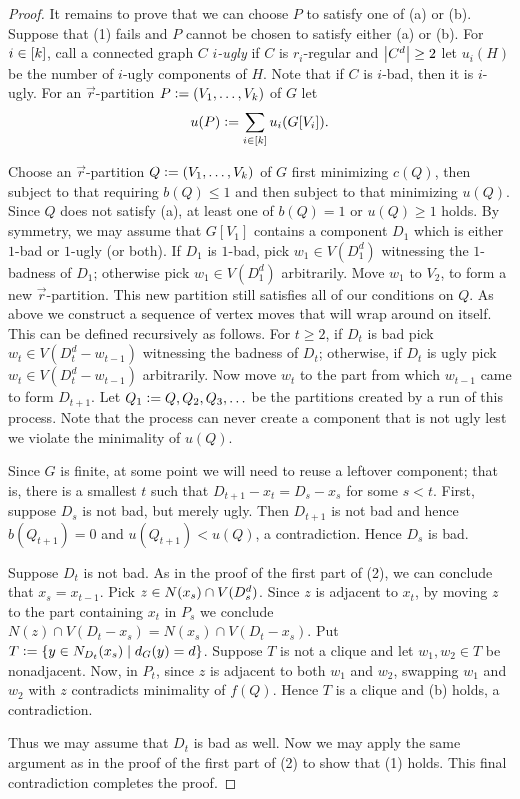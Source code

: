 \begin{proof}
			It remains to prove that we can choose $P$ to satisfy one of (a) or (b).  Suppose that (1) fails and $P$ cannot be chosen to satisfy either (a) or (b).  For $i \in \left[k\right]$, call a connected graph $C$
			\emph{$i$-ugly} if $C$ is $r_i$-regular and $\left|C^{d}\right| \geq 2$ let $u_i(H)$ be the number of $i$-ugly components of $H$.  Note that if $C$ is $i$-bad, then it is $i$-ugly.  For an $\vec{r}$-partition $P \mathrel{\mathop:}= \left( V_1, \ldots, V_k \right)$ of $G$ let
\[u(P) \mathrel{\mathop:}= \sum_{i\in \left[k\right]} u_i(G[V_i]).\]

Choose an $\vec{r}$-partition $Q \mathrel{\mathop:}= \left( V_1, \ldots, V_k \right)$ of $G$ first minimizing $c(Q)$, then subject to that requiring $b(Q) \leq 1$ and then subject to that minimizing $u(Q)$.  Since $Q$ does not satisfy (a), at least one of $b(Q) = 1$ or $u(Q) \geq 1$ holds.  By symmetry, we may assume that $G[V_1]$ contains a component $D_1$ which is either $1$-bad or $1$-ugly (or both).  If $D_1$ is $1$-bad, pick $w_1 \in V(D_1^d)$ witnessing the $1$-badness of $D_1$; otherwise pick $w_1 \in V(D_1^d)$ arbitrarily. Move $w_1$ to $V_2$, to form a new $\vec{r}$-partition.  This new partition still satisfies all of our conditions on $Q$. As above we construct a sequence of vertex moves that will wrap around on itself. This can be defined recursively as follows.  For $t \geq 2$, if $D_t$ is bad pick $w_t \in V(D_t^d - w_{t-1})$ witnessing the badness of $D_t$; otherwise, if $D_t$ is ugly pick $w_t \in V(D_t^d - w_{t-1})$ arbitrarily.  Now move $w_t$ to the part from which $w_{t-1}$ came to form $D_{t+1}$.  Let $Q_1 \mathrel{\mathop:}= Q, Q_2, Q_3, \ldots$ be the partitions created by a run of this process. Note that the process can never create a component that is not ugly lest we violate the minimality of $u(Q)$.  

Since $G$ is finite, at some point we will need to reuse a leftover component; that is, 
there is a smallest $t$ such that $D_{t + 1} - x_t = D_s - x_s$ for some $s <
t$.  First, suppose $D_s$ is not bad, but merely ugly.  Then $D_{t+1}$ is not bad and hence $b(Q_{t+1}) = 0$ and $u(Q_{t+1}) < u(Q)$, a contradiction.  Hence $D_s$ is bad.  

Suppose $D_t$ is not bad.  
As in the proof of the first part of (2), we can conclude that $x_s = x_{t-1}$.  
Pick $z \in N(x_s) \cap V(D_s^{d})$. 
Since $z$ is adjacent to $x_t$, by moving $z$ to the part containing $x_t$ in $P_s$ we conclude 
$N(z) \cap V(D_t - x_s) = N(x_s) \cap V(D_t - x_s)$.  
Put $T \mathrel{\mathop:}= \left\{ y \in N_{D_t}(x_s) \mid d_G(y) = d \right\}$. 
Suppose $T$ is not a clique and let $w_1, w_2 \in T$ be nonadjacent.  
Now, in $P_t$, since $z$ is adjacent to both $w_1$ and $w_2$, swapping $w_1$ and $w_2$ with $z$ contradicts minimality of $f(Q)$.  
Hence $T$ is a clique and (b) holds, a contradiction.

Thus we may assume that $D_t$ is bad as well.  
Now we may apply the same argument as in the proof of the first part of (2) to show that (1) holds.  This final contradiction completes the proof.
			
			
		\end{proof}

